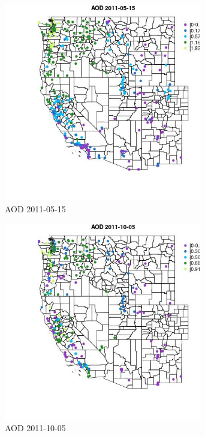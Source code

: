 \begin{figure} 
\centering  
\includegraphics[width=0.77\textwidth]{Code_Outputs/ML_input_report_ML_input_PM25_Step5_part_d_de_duplicated_aves_ML_input_MapObsAOD2011-05-15.jpg} 
\caption{\label{fig:ML_input_report_ML_input_PM25_Step5_part_d_de_duplicated_aves_ML_inputMapObsAOD2011-05-15}AOD 2011-05-15} 
\end{figure} 
 

\begin{figure} 
\centering  
\includegraphics[width=0.77\textwidth]{Code_Outputs/ML_input_report_ML_input_PM25_Step5_part_d_de_duplicated_aves_ML_input_MapObsAOD2011-10-05.jpg} 
\caption{\label{fig:ML_input_report_ML_input_PM25_Step5_part_d_de_duplicated_aves_ML_inputMapObsAOD2011-10-05}AOD 2011-10-05} 
\end{figure} 
 

